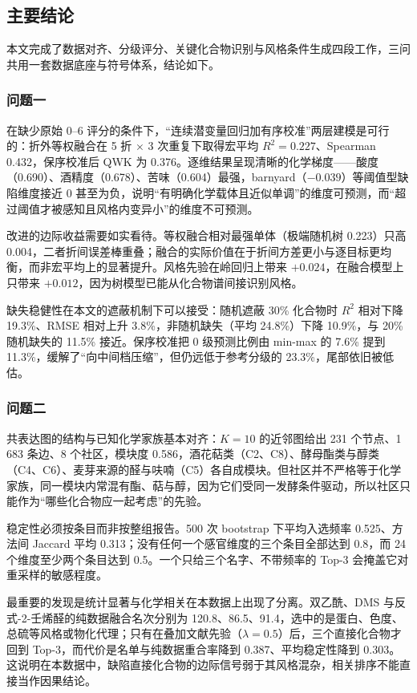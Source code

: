 ﻿\documentclass[UTF8,a4paper,zihao=-4]{ctexart}
\numberwithin{figure}{section}
\numberwithin{table}{section}
\numberwithin{equation}{section}
\begin{document}
\subsection{主要结论}

本文完成了数据对齐、分级评分、关键化合物识别与风格条件生成四段工作，三问共用一套数据底座与符号体系，结论如下。

\subsubsection{问题一}

在缺少原始 0--6 评分的条件下，“连续潜变量回归加有序校准”两层建模是可行的：折外等权融合在 5 折 $\times$ 3 次重复下取得宏平均 $R^2=0.227$、Spearman 0.432，保序校准后 QWK 为 0.376。逐维结果呈现清晰的化学梯度——酸度（0.690）、酒精度（0.678）、苦味（0.604）最强，barnyard（$-0.039$）等阈值型缺陷维度接近 0 甚至为负，说明“有明确化学载体且近似单调”的维度可预测，而“超过阈值才被感知且风格内变异小”的维度不可预测。

改进的边际收益需要如实看待。等权融合相对最强单体（极端随机树 0.223）只高 0.004，二者折间误差棒重叠；融合的实际价值在于折间方差更小与逐目标更均衡，而非宏平均上的显著提升。风格先验在岭回归上带来 $+0.024$，在融合模型上只带来 $+0.012$，因为树模型已能从化合物谱间接识别风格。

缺失稳健性在本文的遮蔽机制下可以接受：随机遮蔽 30\% 化合物时 $R^2$ 相对下降 19.3\%、RMSE 相对上升 3.8\%，非随机缺失（平均 24.8\%）下降 10.9\%，与 20\% 随机缺失的 11.5\% 接近。保序校准把 0 级预测比例由 min-max 的 7.6\% 提到 11.3\%，缓解了“向中间档压缩”，但仍远低于参考分级的 23.3\%，尾部依旧被低估。

\subsubsection{问题二}

共表达图的结构与已知化学家族基本对齐：$K=10$ 的近邻图给出 231 个节点、1\,683 条边、8 个社区，模块度 0.586，酒花萜类（C2、C8）、酵母酯类与醇类（C4、C6）、麦芽来源的醛与呋喃（C5）各自成模块。但社区并不严格等于化学家族，同一模块内常混有酯、萜与醇，因为它们受同一发酵条件驱动，所以社区只能作为“哪些化合物应一起考虑”的先验。

稳定性必须按条目而非按整组报告。500 次 bootstrap 下平均入选频率 0.525、方法间 Jaccard 平均 0.313；没有任何一个感官维度的三个条目全部达到 0.8，而 24 个维度至少两个条目达到 0.5。一个只给三个名字、不带频率的 Top-3 会掩盖它对重采样的敏感程度。

最重要的发现是统计显著与化学相关在本数据上出现了分离。双乙酰、DMS 与反式-2-壬烯醛的纯数据融合名次分别为 120.8、86.5、91.4，选中的是蛋白、色度、总硫等风格或物化代理；只有在叠加文献先验（$\lambda=0.5$）后，三个直接化合物才回到 Top-3，而代价是名单与纯数据重合率降到 0.387、平均稳定性降到 0.303。这说明在本数据中，缺陷直接化合物的边际信号弱于其风格混杂，相关排序不能直接当作因果结论。
\end{document}
